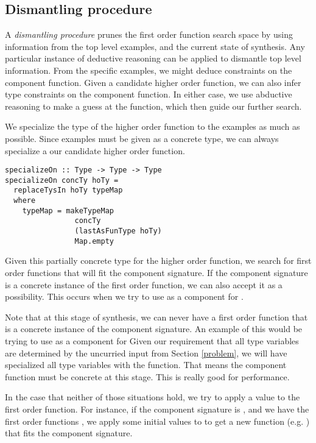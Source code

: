 \subsection{Dismantling procedure}\label{makeFxns}

A \textit{dismantling procedure} prunes the first order function search space by using information from the top level examples, and the current state of synthesis. Any particular instance of deductive reasoning can be applied to dismantle top level information. From the specific examples, we might deduce constraints on the component function. Given a candidate higher order function, we can also infer type constraints on the component function. In either case, we use abductive reasoning to make a guess at the function, which then guide our further search.

We specialize the type of the higher order function to the examples as much as possible. Since examples must be given as a concrete type, we can always specialize a our candidate higher order function. 

\begin{lstlisting}
specializeOn :: Type -> Type -> Type
specializeOn concTy hoTy =
  replaceTysIn hoTy typeMap
  where
    typeMap = makeTypeMap 
                concTy 
                (lastAsFunType hoTy)
                Map.empty
\end{lstlisting}

Given this partially concrete type for the higher order function, we search for first order functions that will fit the component signature.
If the component signature is a concrete instance of the first order function, we can also accept it as a possibility.
This occurs when we try to use  as a component for .

Note that at this stage of synthesis, we can never have a first order function that is a concrete instance of the component signature. 
An example of this would be trying to use  as a component for 
Given our requirement that all type variables are determined by the uncurried input from Section \ref{problem}, we will have specialized all type variables with the  function.
That means the component function must be concrete at this stage.
This is really good for performance.

In the case that neither of those situations hold, we try to apply a value to the first order function.
For instance, if the component signature is , and we have the first order functions , we apply some initial values to \codeinline{(+)} to get a new function (e.g. ) that fits the component signature.


